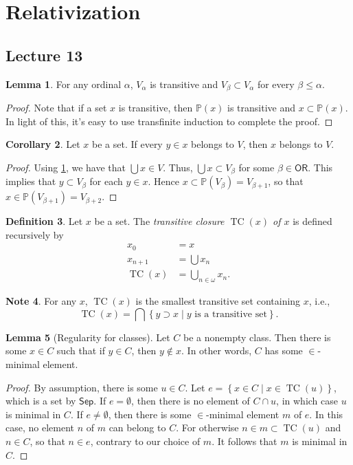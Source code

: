 \documentclass[10pt,letterpaper,cm]{nupset}
\theoremstyle{definition}
\newtheorem{definition}{Definition}[subsection]
\newtheorem{note}[definition]{Note}
\theoremstyle{theorem}
\newtheorem{lemma}[definition]{Lemma}
\newtheorem{corollary}[definition]{Corollary}
\theoremstyle{remark}
\renewcommand{\P}{\mathbb P}
\newcommand{\1}{\mathbf{1}}
\newcommand{\0}{\vec 0}
\newcommand{\ord}{\mathsf{OR}}
\DeclareMathOperator{\tc}{TC}
\begin{document}
\section{Relativization}

\subsection{Lecture 13}


\begin{lemma}\label{cum}
For any ordinal $\alpha$, $V_{\alpha}$ is transitive and $V_{\beta} \subset V_{\alpha}$ for every $\beta \leq \alpha$. 
\end{lemma}
\begin{proof}
Note that if a set $x$ is transitive, then  $\P(x)$ is transitive and $x\subset \P(x)$. In light of this, it's easy to use transfinite induction to complete the proof.
\end{proof}

\begin{corollary}
Let $x$ be a set. If every $y\in x$ belongs to $V$, then $x$ belongs to $V$. 
\end{corollary}
\begin{proof}
Using \cref{cum}, we have that $\bigcup{x} \in V$. Thus, $\bigcup{x}\subset V_{\beta}$ for some $\beta \in \ord$. This implies that $y \subset V_{\beta}$ for each $y\in x$. Hence $x\subset \P(V_{\beta}) = V_{\beta +1}$, so that $x \in \P(V_{\beta +1}) = V_{\beta +2}$.
\end{proof}

\begin{definition}
Let $x$ be a set. The \textit{transitive closure $\tc(x)$ of $x$} is defined recursively by
\begin{align*}
x_0 & = x
 \\ x_{n+1} & = \bigcup {x_n}
 \\ \tc(x) & = \bigcup_{n\in \omega} x_n.
\end{align*}
\end{definition}

\begin{note}
For any $x$, $\tc(x)$ is the smallest transitive set containing $x$, i.e., $$\tc(x) = \bigcap{\left\{y\supset x \mid y \text{ is a transitive set}\right\}}.$$
\end{note}

\begin{lemma}[Regularity for classes]\label{reg}
Let $C$ be a nonempty class. Then there is some $x\in C$ such that if $y\in C$, then $y \notin x$. In other words, $C$ has some $\in$-minimal element.
\end{lemma}
\begin{proof}
By assumption, there is some $u\in C$. Let $e = \left\{ x\in C \mid x \in \tc(u)\right\}$, which is a set by $\mathsf{Sep}$. If $e = \emptyset$, then there is no element of $C \cap u$, in which case $u$ is minimal in $C$. If $e\ne \emptyset$, then there is some $\in$-minimal element $m$ of $e$. In this case, no element $n$ of $m$ can belong to $C$. For otherwise $n\in m\subset \tc(u)$ and $n \in C$, so that $n \in e$, contrary to our choice of $m$. It follows that $m$ is minimal in $C$.
\end{proof}
\end{document}
